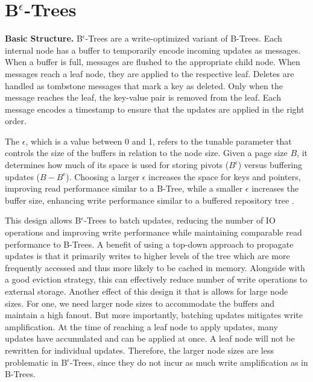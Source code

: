 \section{B$^\epsilon$-Trees}

\textbf{Basic Structure.}
B$^\epsilon$-Trees \cite{bender2015epsilon} are a write-optimized variant of B-Trees.
Each internal node has a buffer to temporarily encode incoming updates as messages.
When a buffer is full, messages are flushed to the appropriate child node.
When messages reach a leaf node, they are applied to the respective leaf.
Deletes are handled as tombstone messages that mark a key as deleted. Only when the message reaches the leaf, the key-value pair is removed from the leaf.
Each message encodes a timestamp to ensure that the updates are applied in the right order.

The $\epsilon$, which is a value between 0 and 1, refers to the tunable parameter that controls the size of the buffers in relation to the node size.
Given a page size $B$, it determines how much of its space is used for storing pivots ($B^\epsilon$) versus buffering updates ($B - B^\epsilon$).
Choosing a larger $\epsilon$ increases the space for keys and pointers, improving read performance similar to a B-Tree, while a smaller $\epsilon$ increases the buffer size, enhancing write performance similar to a buffered repository tree \cite{buchsbaum2000external}.

This design allows B$^\epsilon$-Trees to batch updates, reducing the number of \ac{IO} operations and improving write performance while maintaining comparable read performance to B-Trees.
A benefit of using a top-down approach to propagate updates is that it primarily writes to higher levels of the tree which are more frequently accessed and thus more likely to be cached in memory.
Alongside with a good eviction strategy, this can effectively reduce number of write operations to external storage.
Another effect of this design it that is allows for large node sizes.
For one, we need larger node sizes to accommodate the buffers and maintain a high fanout.
But more importantly, batching updates mitigates write amplification.
At the time of reaching a leaf node to apply updates, many updates have accumulated and can be applied at once. 
A leaf node will not be rewritten for individual updates. 
Therefore, the larger node sizes are less problematic in B$^\epsilon$-Trees, since they do not incur as much write amplification as in B-Trees.

